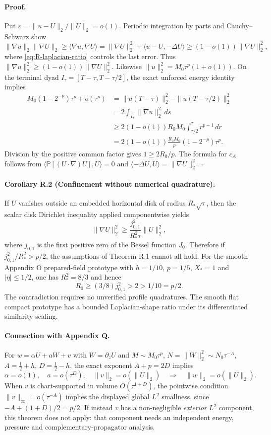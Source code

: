 \paragraph{Proof.}
Put $\varepsilon=\|u-U\|_2/\|U\|_2=o(1)$. Periodic integration
by parts and Cauchy--Schwarz show
\[
 \|\nabla u\|_2\|\nabla U\|_2
 \ge\langle\nabla u,\nabla U\rangle
 =\|\nabla U\|_2^2+\langle u-U,-\Delta U\rangle
 \ge(1-o(1))\|\nabla U\|_2^2,
\]
where \eqref{eq:R-laplacian-ratio} controls the last error.
Thus $\|\nabla u\|_2^2\ge(1-o(1))\|\nabla U\|_2^2$.
Likewise $\|u\|_2^2=M_0\tau^p(1+o(1))$. On the terminal
dyad $I_\tau=[T-\tau,T-\tau/2]$, the exact unforced energy
identity implies
\[
 \begin{aligned}
 M_0(1-2^{-p})\tau^p+o(\tau^p)
 &=\|u(T-\tau)\|_2^2-\|u(T-\tau/2)\|_2^2\\
 &=2\int_{I_\tau}\|\nabla u\|_2^2\,ds\\
 &\ge 2(1-o(1))R_0M_0
  \int_{\tau/2}^{\tau}r^{p-1}\,dr\\
 &=2(1-o(1))\frac{R_0M_0}{p}(1-2^{-p})\tau^p.
 \end{aligned}
\]
Division by the positive common factor gives $1\ge2R_0/p$.
The formula for $c_A$ follows from
$\langle\mathbb P[(U\cdot\nabla)U],U\rangle=0$
and $\langle-\Delta U,U\rangle=\|\nabla U\|_2^2$.
\hfill$\square$

\paragraph{Corollary R.2 (Confinement without numerical quadrature).}
If $U$ vanishes outside an embedded horizontal disk of radius
$R_*\sqrt\tau$, then the scalar disk Dirichlet inequality applied
componentwise yields
\[
 \|\nabla U\|_2^2\ge
 \frac{j_{0,1}^2}{R_*^2\tau}\|U\|_2^2,
\]
where $j_{0,1}$ is the first positive zero of the Bessel
function $J_0$. Therefore if
$j_{0,1}^2/R_*^2>p/2$, the assumptions of Theorem R.1
cannot all hold. For the smooth Appendix O prepared-field
prototype with $h=1/10$, $p=1/5$, $X_*=1$ and
$|\eta|\le1/2$, one has $R_*^2=8/3$ and hence
\[
 R_0\ge (3/8)j_{0,1}^2>2>1/10=p/2.
\]
The contradiction requires no unverified profile quadratures.
The smooth flat compact prototype has a bounded
Laplacian-shape ratio under its differentiated similarity scaling.

\paragraph{Connection with Appendix Q.}
For $w=\alpha U+aW+v$ with $W=\partial_z U$ and
$M\sim M_0\tau^p$, $N=\|W\|_2^2\sim N_0\tau^{-A}$,
$A=\frac12+h$, $D=\frac12-h$, the exact exponent
$A+p=2D$ implies
\[
 \alpha=o(1),\quad a=o(\tau^D),\quad
 \|v\|_2=o(\|U\|_2)
 \quad\Longrightarrow\quad
 \|w\|_2=o(\|U\|_2).
\]
When $v$ is chart-supported in volume $O(\tau^{1+D})$,
the pointwise condition $\|v\|_\infty=o(\tau^{-A})$
implies the displayed global $L^2$ smallness, since
$-A+(1+D)/2=p/2$.
If instead $v$ has a non-negligible \emph{exterior}
$L^2$ component, this theorem does not apply: that
component needs an independent energy, pressure and
complementary-propagator analysis.

